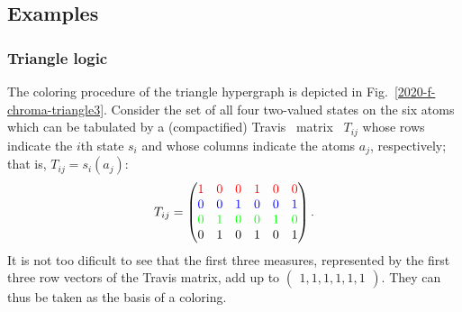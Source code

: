 \documentclass[%
  reprint,
  twocolumn,
 showpacs,
 showkeys,
 preprintnumbers,
 amsmath,amssymb,
 aps,
 pra,
  longbibliography,
 ]{revtex4-1}
\begin{document}
\subsection{Examples}
\subsubsection{Triangle logic}

The coloring procedure of the triangle hypergraph is depicted in Fig.~\ref{2020-f-chroma-triangle3}.
Consider the set of all four two-valued states on the six atoms which can be tabulated by a
(compactified) Travis~\cite{travis-mt-62} matrix~\cite{greechie-66-PhD} $T_{ij}$
whose rows indicate the
$i$th state $s_i$ and whose columns
indicate the atoms $a_j$, respectively; that is, $T_{ij}=s_i(a_j)$:
\begin{equation}
T_{ij}=\begin{pmatrix}
{\color{red}1}&{\color{red}0}&{\color{red}0}&{\color{red}1}&{\color{red}0}&{\color{red}0}\\
{\color{blue}0}&{\color{blue}0}&{\color{blue}1}&{\color{blue}0}&{\color{blue}0}&{\color{blue}1}\\
{\color{green}0}&{\color{green}1}&{\color{green}0}&{\color{green}0}&{\color{green}1}&{\color{green}0}\\
0&1&0&1&0&1
\end{pmatrix}
.
\end{equation}
It is not too dificult to see that the first three measures, represented by the first three row vectors of the
Travis matrix, add up to
$
\begin{pmatrix}
1,1,1,1,1,1
\end{pmatrix}
$. They can thus be taken as the basis of a coloring.
\end{document}

